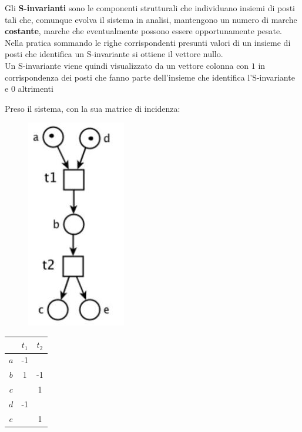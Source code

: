 \documentclass[a4paper,12pt, oneside]{book}
\begin{document}
\begin{definizione}
  Gli \textbf{S-invarianti} sono le componenti strutturali che individuano
  insiemi di posti tali che, comunque evolva il sistema in analisi, mantengono
  un numero di marche \textbf{costante}, marche che eventualmente possono essere
  opportunamente pesate.\\
  Nella pratica sommando le righe corrispondenti presunti valori di un insieme
  di posti che identifica un S-invariante si ottiene il vettore nullo.\\
  Un S-invariante viene quindi visualizzato da un vettore colonna con $1$ in
  corrispondenza dei posti che fanno parte dell'insieme che identifica
  l'S-invariante e $0$ altrimenti
  \begin{esempio}
    Preso il sistema, con la sua matrice di incidenza:
    \begin{figure}[H]
      \centering
      \includegraphics[scale = 0.4]{img/si.jpg} 
    \end{figure}
    \begin{center}
      \begin{tabular}{|c|c|c|}
        \hline
        & $t_1$ & $t_2$\\
        \hline
        $a$ & -1 &\\
        \hline
        $b$ & 1 & -1\\
        \hline
        $c$ & & 1\\
        \hline
        $d$ & -1 & \\
        \hline
        $e$ & & 1\\
        \hline
      \end{tabular}
    \end{center}

\end{esempio}
\end{definizione}
\end{document}
